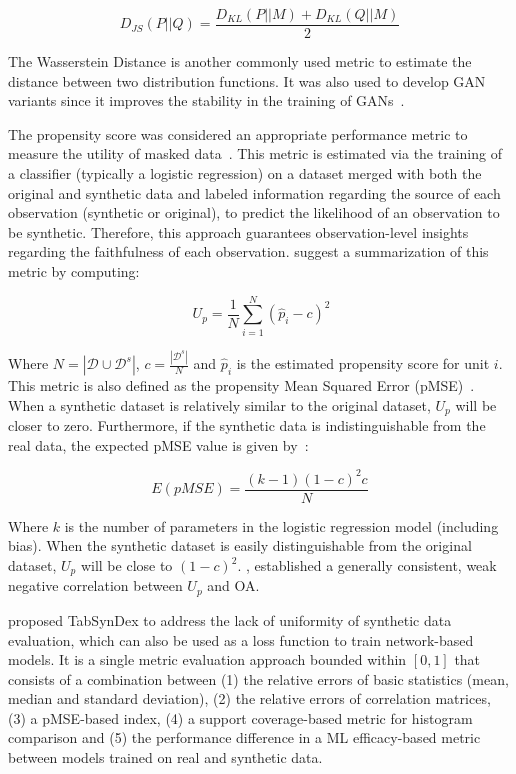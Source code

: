 \documentclass[parskip=full]{scrartcl}
\begin{document}
\begin{equation}
    D_{JS}(P||Q) = \frac{D_{KL}(P||M) + D_{KL}(Q||M)}{2}
\end{equation}

The Wasserstein Distance is another commonly used metric to estimate the
distance between two distribution functions. It was also used to develop GAN
variants since it improves the stability in the training of
GANs~\cite{gulrajani2017improved, goncalves2020generation}.

The propensity score was considered an appropriate performance metric to
measure the utility of masked data~\cite{woo2009global}. This metric is
estimated via the training of a classifier (typically a logistic regression)
on a dataset merged with both the original and synthetic data and labeled
information regarding the source of each observation (synthetic or original),
to predict the likelihood of an observation to be synthetic. Therefore, this
approach guarantees observation-level insights regarding the faithfulness of
each observation. \citet{woo2009global} suggest a summarization of this
metric by computing:

\begin{equation}~\label{ep:propensity}
    U_p = \frac{1}{N} \sum^N_{i=1}{(\hat{p}_i - c)}^2
\end{equation}

Where $N = |\mathcal{D} \cup \mathcal{D}^s|$, $c = \frac{|\mathcal{D}^s|}{N}$
and $\hat{p}_i$ is the estimated propensity score for unit $i$. This metric is
also defined as the propensity Mean Squared Error
(pMSE)~\cite{chundawat2022tabsyndex}. When a synthetic dataset is relatively
similar to the original dataset, $U_p$ will be closer to zero. Furthermore, if
the synthetic data is indistinguishable from the real data, the expected pMSE
value is given by~\cite{snoke2018general}:

\begin{equation}
    E(pMSE) = \frac{(k-1)(1-c)^2c}{N}
\end{equation}

Where $k$ is the number of parameters in the logistic regression model
(including bias). When the synthetic dataset is easily distinguishable from
the original dataset, $U_p$ will be close to ${(1-c)}^2$.
\citet{dankar2021fake}, established a generally consistent, weak negative
correlation between $U_p$ and OA\@.

\citet{chundawat2022tabsyndex} proposed TabSynDex to address the lack of
uniformity of synthetic data evaluation, which can also be used as a loss
function to train network-based models. It is a single metric evaluation
approach bounded within $[0,1]$ that consists of a combination between (1) the
relative errors of basic statistics (mean, median and standard deviation), (2)
the relative errors of correlation matrices, (3) a pMSE-based index, (4) a
support coverage-based metric for histogram comparison and (5) the performance
difference in a ML efficacy-based metric between models trained on real and
synthetic data.
\end{document}

